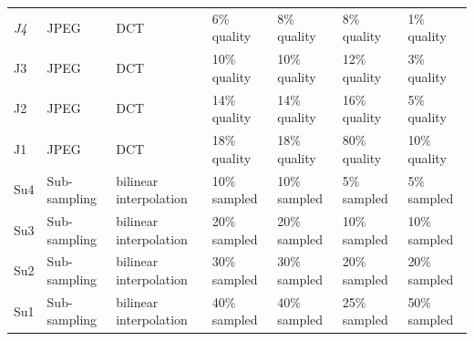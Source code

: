 \begin{table}[]
\begin{tabular}{lllllll}
\textit{J4} & JPEG            & DCT                    & 6\% quality    & 8\% quality  & 8\% quality          & 1\% quality    \\
J3 & JPEG            & DCT                    & 10\% quality   & 10\% quality & 12\% quality         & 3\% quality    \\
J2 & JPEG            & DCT                    & 14\% quality   & 14\% quality & 16\% quality         & 5\% quality    \\
J1 & JPEG            & DCT                    & 18\% quality   & 18\% quality & 80\% quality         & 10\% quality   \\
Su4 & Sub-sampling    & bilinear interpolation & 10\% sampled   & 10\% sampled & 5\% sampled          & 5\% sampled    \\
Su3 & Sub-sampling    & bilinear interpolation & 20\% sampled   & 20\% sampled & 10\% sampled         & 10\% sampled   \\
Su2 & Sub-sampling    & bilinear interpolation & 30\% sampled   & 30\% sampled & 20\% sampled         & 20\% sampled   \\
Su1 & Sub-sampling    & bilinear interpolation & 40\% sampled   & 40\% sampled & 25\% sampled         & 50\% sampled  
\end{tabular}
\end{table}

